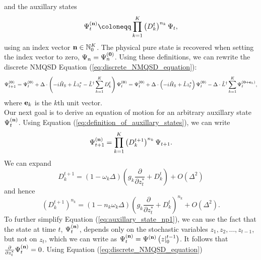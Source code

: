 and the auxillary states
\begin{equation}
    \label{eq:definition_of_auxillary_states}
    \Psi_t^{(\vectorbold{n})} \coloneqq \prod_{k=1}^{K} \left(D_k^t\right)^{n_k}\Psi_t,
\end{equation}
using an index vector $\vectorbold{n}\in\mathbb{N}_0^{K}$. The physical pure state is
recovered when setting the index vector to zero, $\Psi_n = \Psi_n^{(\vectorbold{0})}$.
Using these definitions, we can rewrite the discrete NMQSD Equation (\ref{eq:discrete_NMQSD_equation}):
\begin{equation*}
    \Psi_{t+1}^{(\vectorbold{0})} = \Psi_{t}^{(\vectorbold{0})} + \Delta \cdot \left(
        -i\hat{H}_\text{S} + \hat{L}z_t^* - \hat{L}^\dagger\sum_{k=1}^{K}D_k^t
    \right) \Psi_{t}^{(\vectorbold{0})}
    = \Psi_{t}^{(\vectorbold{0})} + \Delta \cdot \left(
        -i\hat{H}_\text{S} + \hat{L}z_t^*
    \right) \Psi_{t}^{(\vectorbold{0})} - \Delta\cdot\hat{L}^\dagger\sum_{k=1}^{K}\Psi_t^{(\vectorbold{0}+\vectorbold{e}_k)},
\end{equation*}
where $\vectorbold{e}_k$ is the $k$th unit vector.
\\
Our next goal is to derive an equation of motion for an arbitrary auxillary state $\Psi_t^{(\vectorbold{n})}$.
Using Equation (\ref{eq:definition_of_auxillary_states}), we can write
\begin{equation}
    \label{eq:auxillary_state_np1}
    \Psi_{t+1}^{(\vectorbold{n})} = \prod_{k=1}^{K} \left(D_k^{t+1}\right)^{n_k} \Psi_{t+1}.
\end{equation}
We can expand
\begin{equation*}
    D_k^{t+1} = \left(1-\omega_k\Delta\right)\left(g_k\frac{\partial}{\partial z_t^*} + D_k^t\right) + O\left(\Delta^2\right)
\end{equation*}
and hence
\begin{equation*}
    \left(D_k^{t+1}\right)^{n_k} = 
    \left(1-n_k\omega_k\Delta\right)
    \left(g_k\frac{\partial}{\partial z_t^*} + D_k^t\right)^{n_k} + O\left(\Delta^2\right).
\end{equation*}
To further simplify Equation (\ref{eq:auxillary_state_np1}), we can use the fact that the state
at time $t$, $\Psi^{(\vectorbold{n})}_t$, depends only on the stochastic variables $z_1, z_2, \dots, z_{t-1}$, but not
on $z_t$, which we can write as $\Psi^{(\vectorbold{n})}_t=\Psi^{(\vectorbold{n})}\left(z|_0^{t-1}\right)$. It follows that
$\frac{\partial}{\partial z_t^*}\Psi^{(\vectorbold{n})}_t = 0$. Using Equation (\ref{eq:discrete_NMQSD_equation})
